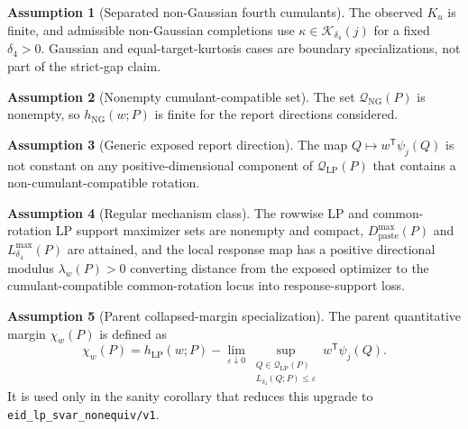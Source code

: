 \documentclass[11pt]{article}
\newcommand{\transpose}{\mathsf{T}}
\theoremstyle{definition}
\newtheorem{assumption}{Assumption}
\theoremstyle{plain}
\theoremstyle{remark}
\begin{document}
\begin{assumption}[Separated non-Gaussian fourth cumulants]\label{ass:cumulants}
The observed \(K_u\) is finite, and admissible non-Gaussian completions use \(\kappa\in\mathcal K_{\delta_4}(j)\) for a fixed \(\delta_4>0\).  Gaussian and equal-target-kurtosis cases are boundary specializations, not part of the strict-gap claim.
\end{assumption}

\begin{assumption}[Nonempty cumulant-compatible set]\label{ass:nonempty-ng}
The set \(\mathcal Q_{\mathrm{NG}}(P)\) is nonempty, so \(h_{\mathrm{NG}}(w;P)\) is finite for the report directions considered.
\end{assumption}

\begin{assumption}[Generic exposed report direction]\label{ass:generic-w}
The map \(Q\mapsto w^\transpose\psi_j(Q)\) is not constant on any positive-dimensional component of \(\mathcal Q_{\mathrm{LP}}(P)\) that contains a non-cumulant-compatible rotation.
\end{assumption}

\begin{assumption}[Regular mechanism class]\label{ass:regular-mechanism}
The rowwise LP and common-rotation LP support maximizer sets are nonempty and compact, \(D_{\mathrm{paste}}^{\max}(P)\) and \(L_{\delta_4}^{\max}(P)\) are attained, and the local response map has a positive directional modulus \(\lambda_w(P)>0\) converting distance from the exposed optimizer to the cumulant-compatible common-rotation locus into response-support loss.
\end{assumption}

\begin{assumption}[Parent collapsed-margin specialization]\label{ass:parent-margin}
The parent quantitative margin \(\chi_w(P)\) is defined as
\[
\chi_w(P)=h_{\mathrm{LP}}(w;P)-
\lim_{\varepsilon\downarrow0}
\sup_{\substack{Q\in\mathcal Q_{\mathrm{LP}}(P)\\L_{\delta_4}(Q;P)\le\varepsilon}}
w^\transpose\psi_j(Q).
\]
It is used only in the sanity corollary that reduces this upgrade to \texttt{eid\_lp\_svar\_nonequiv/v1}.
\end{assumption}
\end{document}
